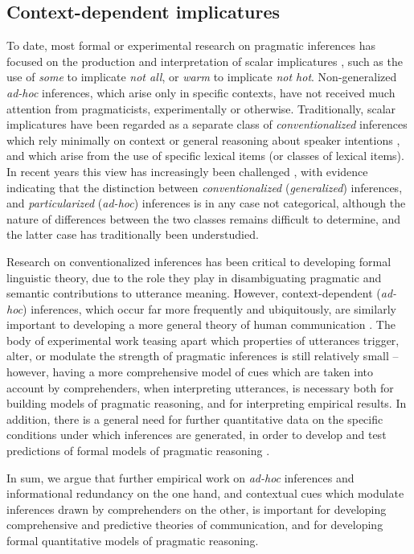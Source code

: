 \subsection{Context-dependent
implicatures}\label{context-dependent-implicatures}

To date, most formal or experimental research on pragmatic inferences
has focused on the production and interpretation of scalar implicatures
\citep{Horn1984,Levinson2000}, such as the use of \emph{some} to
implicate \emph{not all}, or \emph{warm} to implicate \emph{not hot}.
Non-generalized \emph{ad-hoc} inferences, which arise only in specific
contexts, have not received much attention from pragmaticists,
experimentally or otherwise. Traditionally, scalar implicatures have
been regarded as a separate class of \emph{conventionalized} inferences
which rely minimally on context or general reasoning about speaker
intentions \citep{Levinson2000}, and which arise from the use of specific
lexical items (or classes of lexical items). In recent years this view
has increasingly been challenged \citep{Degen2016, Grodner2010}, with evidence indicating
that the distinction between \emph{conventionalized}
(\emph{generalized}) inferences, and \emph{particularized}
(\emph{ad-hoc}) inferences is in any case not categorical, although the
nature of differences between the two classes remains difficult to
determine, and the latter case has traditionally been understudied.

Research on conventionalized inferences has been critical to developing
formal linguistic theory, due to the role they play in disambiguating
pragmatic and semantic contributions to utterance meaning. However,
context-dependent (\emph{ad-hoc}) inferences, which occur far more
frequently and ubiquitously, are similarly important to developing a
more general theory of human communication \citep[as originally intended by][]{Grice1975}. The body of experimental work teasing apart which
properties of utterances trigger, alter, or modulate the strength of
pragmatic inferences is still relatively small -- however, having a more
comprehensive model of cues which are taken into account by
comprehenders, when interpreting utterances, is necessary both for
building models of pragmatic reasoning, and for interpreting empirical
results. In addition, there is a general need for further quantitative
data on the specific conditions under which inferences are generated, in
order to develop and test predictions of formal models of pragmatic
reasoning \citep[cf.][]{Frank2012}.

In sum, we argue that further empirical work on \emph{ad-hoc} inferences
and informational redundancy on the one hand, and contextual cues which
modulate inferences drawn by comprehenders on the other, is important
for developing comprehensive and predictive theories of communication,
and for developing formal quantitative models of pragmatic reasoning.
